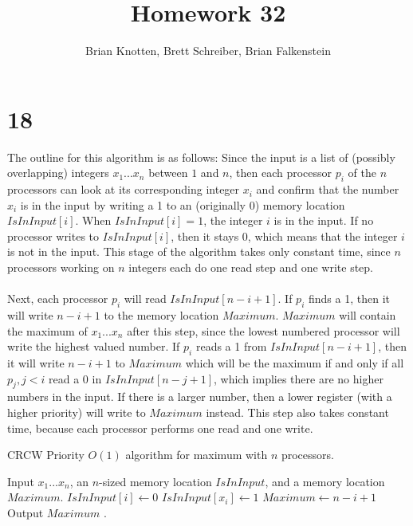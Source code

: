 \documentclass[letterpaper,notitlepage,twoside]{article}
\begin{document}
\title{Homework 32}
\author{Brian Knotten, Brett Schreiber, Brian Falkenstein}
\maketitle

\section*{18}
The outline for this algorithm is as follows: Since the input is a list of
(possibly overlapping) integers $x_1...x_n$ between $1$ and $n$, then each
processor $p_i$ of the $n$ processors can look at its corresponding integer
$x_i$ and confirm that the number $x_i$ is in the input by writing a 1 to an
(originally 0) memory location $IsInInput[i]$. When $IsInInput[i] = 1$, the
integer $i$ is in the input. If no processor writes to $IsInInput[i]$, then it
stays 0, which means that the integer $i$ is not in the input. This stage of
the algorithm takes only constant time, since $n$ processors working on $n$
integers each do one read step and one write step.
\\\\
Next, each processor $p_i$ will read $IsInInput[n - i + 1]$. If $p_i$ finds a 1,
then it will write $n - i + 1$ to the memory location $Maximum$. $Maximum$ will
contain the maximum of $x_1...x_n$ after this step, since the lowest numbered
processor will write the highest valued number. If $p_i$ reads a 1 from
$IsInInput[n - i + 1]$, then it will write $n - i + 1$ to $Maximum$ which
will be the maximum if and only if all $p_j, j < i$ read a 0 in
$IsInInput[n - j + 1]$, which implies there are no higher numbers in the input.
If there is a larger number, then a lower register (with a higher priority) will
write to $Maximum$ instead. This step also takes constant time, because each
processor performs one read and one write.

\begin{algorithm}[H]
  \begin{algorithmic}%
    \caption{CRCW Priority $O(1)$ algorithm for maximum with $n$ processors.}
    \Require Input $x_1...x_n$, an $n$-sized memory location $IsInInput$, and a memory location $Maximum$.
    \State $IsInInput[i] \gets 0$ 
    \State $IsInInput[x_i] \gets 1$ 
        \State $Maximum \gets n - i + 1$ 
    \EndIf
     
        \State Output $Maximum$ .
    \EndIf
  \end{algorithmic}
\end{algorithm}
\end{document}
